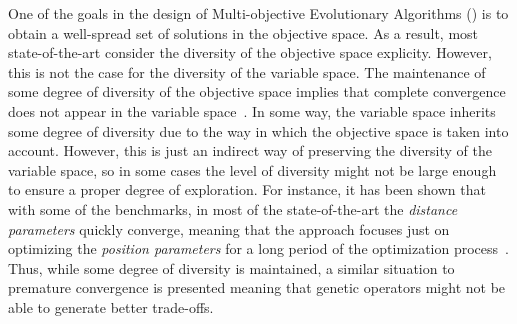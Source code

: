 One of the goals in the design of Multi-objective Evolutionary Algorithms (\MOEAS{}) is to obtain a well-spread 
set of solutions in the objective space.
%
As a result, most state-of-the-art \MOEAS{} consider the diversity of the objective space explicity.
%
However, this is not the case for the diversity of the variable space.
%
The maintenance of some degree of diversity of the objective space implies that complete convergence 
does not appear in the variable space~\cite{Joel:GDE3_CEC09}.
%
In some way, the variable space inherits some degree of diversity due to the way in which the objective space is 
taken into account. 
%
However, this is just an indirect way of preserving the diversity of the variable space, so 
in some cases the level of diversity might not be large enough to ensure a proper degree of exploration.
%
For instance, it has been shown that with some of the \WFG{} benchmarks, in most of the state-of-the-art \MOEAS{} 
the \textit{distance parameters} quickly converge, meaning that the approach focuses just on optimizing the 
\textit{position parameters} for a long period of the optimization process~\cite{Joel:GDE3_CEC09}.
%
Thus, while some degree of diversity is maintained, a similar situation to premature convergence is presented
meaning that genetic operators might not be able to generate better trade-offs. 

